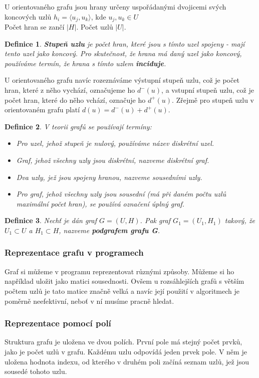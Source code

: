 \documentclass[10pt,a4paper]{article}
\newtheorem{definition}{Definice}
\begin{document}
U orientovaného grafu jsou hrany určeny uspořádanými dvojicemi svých koncových uzlů $h_i = \langle u_j, u_k \rangle$, kde $u_j, u_k \in U$ \\
Počet hran se zančí $|H|$. Počet uzlů $|U|$.
\begin{definition}
\textbf{Stupeň uzlu} je počet hran, které jsou s tímto uzel spojeny - mají tento uzel jako koncový. Pro skutečnost, že hrana má daný uzel jako koncový, používáme termín, že hrana s tímto uzlem \textbf{inciduje}.
\end{definition}
U orientovaného grafu navíc rozeznáváme výstupní stupeň uzlu, což je počet hran, které z něho vychází, označujeme ho $d^-(u)$, a vstupní stupeň uzlu, což je počet hran, které do něho vchází, označuje ho $d^+(u)$. Zřejmě pro stupeň uzlu v orientovaném grafu platí $d(u) = d^-(u) + d^+(u) $.
\begin{definition}
V teorii grafů se používají termíny:
\begin{itemize}
	\item Pro uzel, jehož stupeň je nulový, používáme název diskrétní uzel.
	\item Graf, jehož všechny uzly jsou diskrétní, nazveme diskrétní graf.
	\item Dva uzly, jež jsou spojeny hranou, nazveme sousedními uzly.
	\item Pro graf, jehož všechny uzly jsou sousední (má při daném počtu uzlů maximální počet hran), se používá označení úplný graf.
\end{itemize}
\end{definition}
\begin{definition}
Nechť je dán graf $G = (U, H)$. Pak graf $G_1 = (U_1 , H_1 )$ takový, že $U_1 \subset U$ a $H_1 \subset H$, nazveme \textbf{podgrafem grafu G}.
\end{definition}
\subsubsection{Reprezentace grafu v programech}
Graf si můžeme v programu reprezentovat různými způsoby. Můžeme si ho například uložit jako matici sousednosti. Ovšem u rozsáhlejších grafů s větším počtem uzlů je tato matice značně velká a navíc její použití v algoritmech je poměrně neefektivní, neboť v ní musíme pracně hledat.
\subsubsection{Reprezentace pomocí polí}
Struktura grafu je uložena ve dvou polích. První pole má stejný počet prvků, jako je počet uzlů v grafu. Každému uzlu odpovídá jeden prvek pole. V něm je uložena hodnota indexu, od kterého v druhém poli začíná seznam uzlů, jež jsou sousedé tohoto uzlu.
\end{document}
